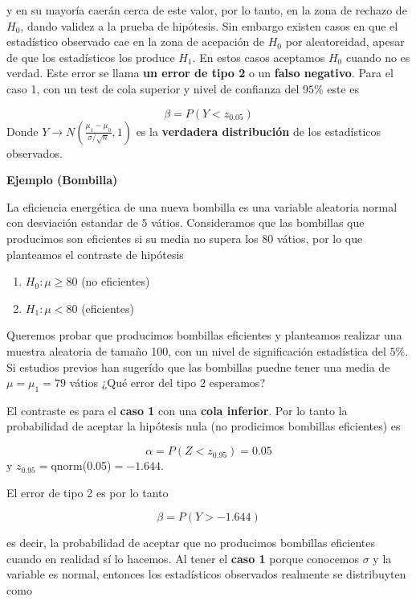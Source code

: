 \documentclass[
]{book}
\providecommand{\tightlist}{%
  \setlength{\itemsep}{0pt}\setlength{\parskip}{0pt}}
\begin{document}
y en su mayoría caerán cerca de este valor, por lo tanto, en la zona de rechazo de \(H_0\), dando validez a la prueba de hipótesis. Sin embargo existen casos en que el estadístico observado cae en la zona de acepación de \(H_0\) por aleatoreidad, apesar de que los estadísticos los produce \(H_1\). En estos casos aceptamos \(H_0\) cuando no es verdad. Este error se llama \textbf{un error de tipo 2} o un \textbf{falso negativo}. Para el caso 1, con un test de cola superior y nivel de confianza del \(95\%\) este es

\[\beta= P(Y < z_{0.05})\]
Donde \(Y \rightarrow N(\frac{\mu_1-\mu_0}{\sigma/\sqrt{n}},1)\) es la \textbf{verdadera distribución} de los estadísticos observados.

\textbf{Ejemplo (Bombilla)}

La eficiencia energética de una nueva bombilla es una variable aleatoria normal con desviación estandar de \(5\) vátios. Consideramos que las bombillas que producimos son eficientes si su media no supera los \(80\) vátios, por lo que planteamos el contraste de hipótesis

\begin{enumerate}
\def\labelenumi{\alph{enumi}.}
\tightlist
\item
  \(H_0 : \mu \geq 80\) (no eficientes)
\item
  \(H_1 : \mu < 80\) (eficientes)
\end{enumerate}

Queremos probar que producimos bombillas eficientes y planteamos realizar una muestra aleatoria de tamaño 100, con un nivel de significación estadística del \(5\%\). Si estudios previos han sugerído que las bombillas puedne tener una media de \(\mu=\mu_1=79\) vátios ¿Qué error del tipo 2 esperamos?

El contraste es para el \textbf{caso 1} con una \textbf{cola inferior}. Por lo tanto la probabilidad de aceptar la hipótesis nula (no prodicimos bombillas eficientes) es

\[\alpha = P(Z< z_{0.95})=0.05\]
y \(z_{0.95}=\)qnorm(0.05)\(=-1.644\).

El error de tipo 2 es por lo tanto

\[\beta= P(Y > -1.644)\]

es decir, la probabilidad de aceptar que no producimos bombillas eficientes cuando en realidad sí lo hacemos. Al tener el \textbf{caso 1} porque conocemos \(\sigma\) y la variable es normal, entonces los estadísticos observados realmente se distribuyten como
\end{document}
